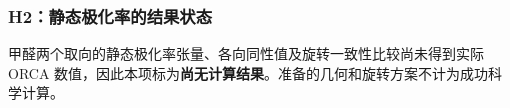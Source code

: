 \subsubsection{H2：静态极化率的结果状态}
甲醛两个取向的静态极化率张量、各向同性值及旋转一致性比较尚未得到实际 ORCA 数值，因此本项标为\textbf{尚无计算结果}。准备的几何和旋转方案不计为成功科学计算。
